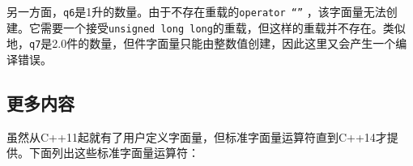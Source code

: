 另一方面，\texttt{q6}是1升的数量。由于不存在重载的\texttt{operator “”} ，该字面量无法创建。它需要一个接受\texttt{unsigned long long}的重载，但这样的重载并不存在。类似地，\texttt{q7}是2.0件的数量，但件字面量只能由整数值创建，因此这里又会产生一个编译错误。



\subsection{更多内容}



虽然从C++11起就有了用户定义字面量，但标准字面量运算符直到C++14才提供。下面列出这些标准字面量运算符：



